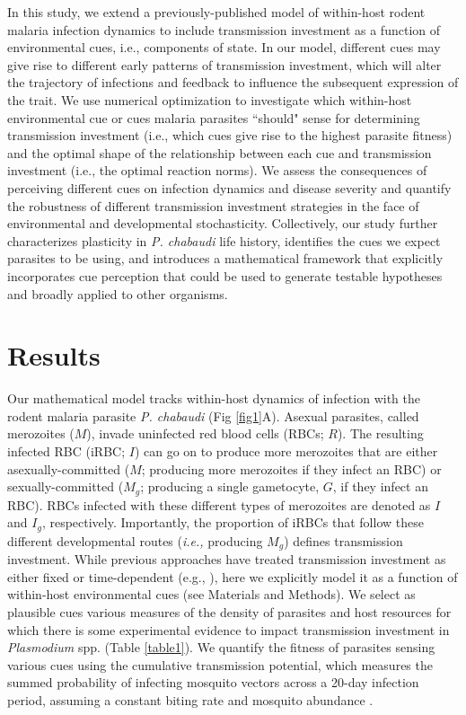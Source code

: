 \documentclass[10pt,letterpaper]{article}
\begin{document}
In this study, we extend a previously-published model of within-host rodent malaria infection dynamics \cite{greischar_predicting_2016} to include transmission investment as a function of environmental cues, i.e., components of state. In our model, different cues may give rise to different early patterns of transmission investment, which will alter the trajectory of infections and feedback to influence the subsequent expression of the trait. We use numerical optimization to investigate which within-host environmental cue or cues malaria parasites ``should" sense for determining transmission investment (i.e., which cues give rise to the highest parasite fitness) and the optimal shape of the relationship between each cue and transmission investment (i.e., the optimal reaction norms). We assess the consequences of perceiving different cues on infection dynamics and disease severity and quantify the robustness of different transmission investment strategies in the face of environmental and developmental stochasticity. Collectively, our study further characterizes plasticity in \emph{P. chabaudi} life history, identifies the cues we expect parasites to be using, and introduces a mathematical framework that explicitly incorporates cue perception that could be used to generate testable hypotheses and broadly applied to other organisms.

\section*{Results}
Our mathematical model tracks within-host dynamics of infection with the rodent malaria parasite \emph{P. chabaudi} (Fig \ref{fig1}A). Asexual parasites, called merozoites ($M$), invade uninfected red blood cells (RBCs; $R$). The resulting infected RBC (iRBC; $I$) can go on to produce more merozoites that are either asexually-committed ($M$; producing more merozoites if they infect an RBC) or sexually-committed ($M_g$; producing a single gametocyte, $G$, if they infect an RBC). RBCs infected with these different types of merozoites are denoted as $I$ and $I_g$, respectively. Importantly, the proportion of iRBCs that follow these different developmental routes (\emph{i.e.,} producing $M_g$) defines transmission investment. While previous approaches have treated transmission investment as either fixed or time-dependent (e.g., \cite{koella_optimal_1995,mckenzie_integrated_2005,bousema_epidemiology_2011, greischar_predicting_2016,cao_modeling_2019,greischar_partitioning_2019, early_declines_2022}), here we explicitly model it as a function of within-host environmental cues (see Materials and Methods). We select as plausible cues various measures of the density of parasites and host resources for which there is some experimental evidence to impact transmission investment in \emph{Plasmodium} spp. (Table \ref{table1}). We quantify the fitness of parasites sensing various cues using the cumulative transmission potential, which measures the summed probability of infecting mosquito vectors across a 20-day infection period, assuming a constant biting rate and mosquito abundance \cite{greischar_predicting_2016}.\newline
\end{document}
